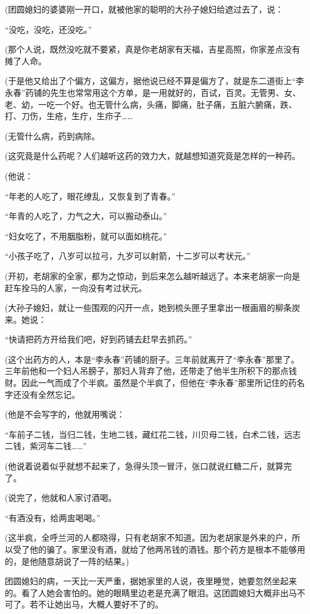 \par (团圆媳妇的婆婆刚一开口，就被他家的聪明的大孙子媳妇给遮过去了，说：
\par “没吃，没吃，还没吃。”
\par (那个人说，既然没吃就不要紧，真是你老胡家有天福，吉星高照，你家差点没有摊了人命。
\par (于是他又给出了个偏方，这偏方，据他说已经不算是偏方了，就是东二道街上“李永春”药铺的先生也常常用这个方单，是一用就好的，百试，百灵。无管男、女、老、幼，一吃一个好。也无管什么病，头痛，脚痛，肚子痛，五脏六腑痛，跌、打、刀伤，生疮，生疔，生疖子……
\par (无管什么病，药到病除。
\par (这究竟是什么药呢？人们越听这药的效力大，就越想知道究竟是怎样的一种药。
\par (他说：
\par “年老的人吃了，眼花缭乱，又恢复到了青春。”
\par “年青的人吃了，力气之大，可以搬动泰山。”
\par “妇女吃了，不用胭脂粉，就可以面如桃花。”
\par “小孩子吃了，八岁可以拉弓，九岁可以射箭，十二岁可以考状元。”
\par (开初，老胡家的全家，都为之惊动，到后来怎么越听越远了。本来老胡家一向是赶车拴马的人家，一向没有考过状元。
\par (大孙子媳妇，就让一些围观的闪开一点，她到梳头匣子里拿出一根画眉的柳条炭来。她说：
\par “快请把药方开给我们吧，好到药铺去赶早去抓药。”
\par (这个出药方的人，本是“李永春”药铺的厨子。三年前就离开了“李永春”那里了。三年前他和一个妇人吊膀子，那妇人背弃了他，还带走了他半生所积下的那点钱财。因此一气而成了个半疯。虽然是个半疯了，但他在“李永春”那里所记住的药名字还没有全然忘记。
\par (他是不会写字的，他就用嘴说：
\par “车前子二钱，当归二钱，生地二钱，藏红花二钱，川贝母二钱，白术二钱，远志二钱，紫河车二钱……”
\par (他说着说着似乎就想不起来了，急得头顶一冒汗，张口就说红糖二斤，就算完了。
\par (说完了，他就和人家讨酒喝。
\par “有酒没有，给两盅喝喝。”
\par (这半疯，全呼兰河的人都晓得，只有老胡家不知道。因为老胡家是外来的户，所以受了他的骗了。家里没有酒，就给了他两吊钱的酒钱。那个药方是根本不能够用的，是他随意胡说了一阵的结果。)
\par 团圆媳妇的病，一天比一天严重，据她家里的人说，夜里睡觉，她要忽然坐起来的。看了人她会害怕的。她的眼睛里边老是充满了眼泪。这团圆媳妇大概非出马不可了。若不让她出马，大概人要好不了的。
